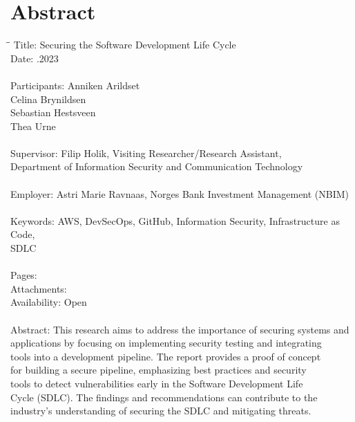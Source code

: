 \newpage
\thispagestyle{empty}
\mbox{}
\chapter*{Abstract}
{ %
\begin{tabbing}
\hspace{2cm}\=\hspace{1.5cm}\=\kill %
Title: \> \>Securing the Software Development Life Cycle \\
Date: \> .2023 \\ 
\\
Participants: \> \> Anniken Arildset \\ \> \> Celina Brynildsen \\ \> \> Sebastian Hestsveen \\ \> \> Thea Urne \\
\\
Supervisor: \> \> Filip Holik, Visiting Researcher/Research Assistant, \\\> \> Department of Information Security and Communication Technology \\
\\
Employer: \> \>  Astri Marie Ravnaas, Norges Bank Investment Management (NBIM) \\
\\
Keywords: \> \> AWS, DevSecOps, GitHub, Information Security, Infrastructure as Code,\\\> \> SDLC \\
\\
Pages: \>  \\
Attachments: \>  \\
Availability: \> \> Open \\
\\
Abstract: 
\>\>This research aims to address the importance of securing systems and \\ \> \>applications by focusing on implementing security testing and integrating\\ \> \>  tools into a development pipeline. The report provides a proof of concept\\ \> \> for building a secure pipeline, emphasizing best practices and security\\ \> \> tools to detect vulnerabilities early in the Software Development Life\\ \> \> Cycle (SDLC). The findings and recommendations can contribute to the\\ \> \> industry's understanding of securing the SDLC and mitigating threats.

\end{tabbing}
}